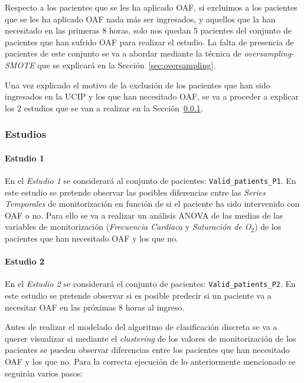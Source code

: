 Respecto a los pacientes que se les ha aplicado OAF, si excluimos a los pacientes que se les ha aplicado OAF nada más ser ingresados, y aquellos que la han necesitado en las primeras $8$ horas, solo nos quedan 5 pacientes del conjunto de pacientes que han sufrido OAF para realizar el estudio. La falta de presencia de pacientes de este conjunto se va a abordar mediante la técnica de \textit{oversampling-SMOTE} que se explicará en la Sección~\ref{sec:oversampling}.

Una vez explicado el motivo de la exclusión de los pacientes que han sido ingresados en la UCIP y los que han necesitado OAF, se va a proceder a explicar los $2$ estudios que se van a realizar en la Sección~\ref{sec:estudios}.

\subsubsection{Estudios}\label{sec:estudios}

\paragraph{Estudio 1}\label{sec:estudio1}

En el \textit{Estudio 1} se considerará al conjunto de pacientes: \texttt{Valid\_patients\_P1}. En este estudio se pretende observar las posibles diferencias entre las \textit{Series Temporales} de monitorización en función de si el paciente ha sido intervenido con OAF o no. Para ello se va a realizar un análisis ANOVA de las medias de las variables de monitorización (\textit{Frecuencia Cardiaca} y \textit{Saturación de O$_2$}) de los pacientes que han necesitado OAF y los que no.

\paragraph{Estudio 2}\label{sec:estudio1}

En el \textit{Estudio 2} se considerará el conjunto de pacientes: \texttt{Valid\_patients\_P2}. En este estudio se pretende observar si es posible predecir si un paciente va a necesitar OAF en las próximas $8$ horas al ingreso. 

Antes de realizar el modelado del algoritmo de clasificación discreta se va a querer visualizar si mediante el \textit{clustering} de los valores de monitorización de los pacientes se pueden observar diferencias entre los pacientes que han necesitado OAF y los que no. Para la correcta ejecución de lo anteriormente mencionado se seguirán varios pasos:

